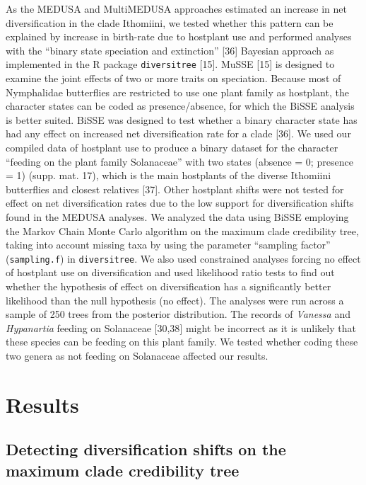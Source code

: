 \documentclass[10pt]{article}
\begin{document}
As the MEDUSA and MultiMEDUSA approaches estimated an increase in net
diversification in the clade Ithomiini, we tested whether this pattern
can be explained by increase in birth-rate due to hostplant use and
performed analyses with the ``binary state speciation and extinction''
{[}36{]} Bayesian approach as implemented in the R package
\texttt{diversitree} {[}15{]}. MuSSE {[}15{]} is designed to examine the
joint effects of two or more traits on speciation. Because most of
Nymphalidae butterflies are restricted to use one plant family as
hostplant, the character states can be coded as presence/absence, for
which the BiSSE analysis is better suited. BiSSE was designed to test
whether a binary character state has had any effect on increased net
diversification rate for a clade {[}36{]}. We used our compiled data of
hostplant use to produce a binary dataset for the character ``feeding on
the plant family Solanaceae'' with two states (absence = 0; presence =
1) (supp. mat. 17), which is the main hostplants of the diverse
Ithomiini butterflies and closest relatives {[}37{]}. Other hostplant
shifts were not tested for effect on net diversification rates due to
the low support for diversification shifts found in the MEDUSA analyses.
We analyzed the data using BiSSE employing the Markov Chain Monte Carlo
algorithm on the maximum clade credibility tree, taking into account
missing taxa by using the parameter ``sampling factor''
(\texttt{sampling.f}) in \texttt{diversitree}. We also used constrained
analyses forcing no effect of hostplant use on diversification and used
likelihood ratio tests to find out whether the hypothesis of effect on
diversification has a significantly better likelihood than the null
hypothesis (no effect). The analyses were run across a sample of 250
trees from the posterior distribution. The records of \emph{Vanessa} and
\emph{Hypanartia} feeding on Solanaceae {[}30,38{]} might be incorrect
as it is unlikely that these species can be feeding on this plant
family. We tested whether coding these two genera as not feeding on
Solanaceae affected our results.

\section*{Results}

\subsection*{Detecting diversification shifts on the maximum clade
credibility tree}
\end{document}
